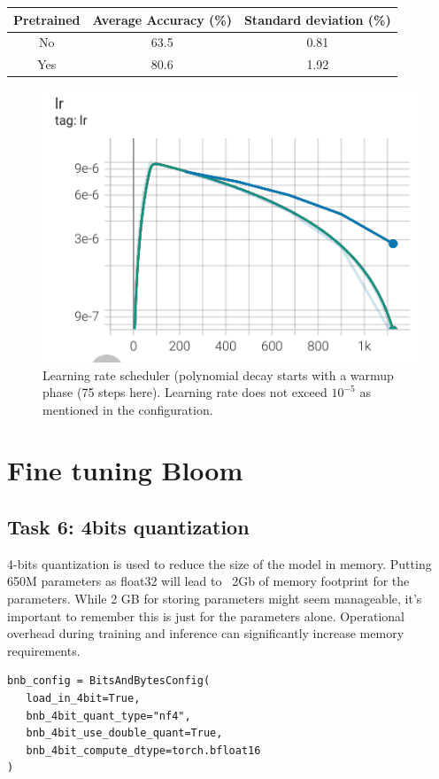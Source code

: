 \documentclass[a4paper]{article}
\begin{document}
\begin{center}
    \begin{tabular}{||c c c |} 
     \hline
     Pretrained & Average Accuracy (\%)  & Standard deviation  (\%)\\ [0.5ex] 
     \hline\hline
     No & 63.5  & 0.81\\ 
     \hline
     Yes & 80.6  & 1.92\\
     \hline
    \end{tabular}
\end{center}


\begin{figure}[ht]
    \centering
    \includegraphics[width=.6\textwidth]{figures/lr_curves.png}
    \caption{Learning rate scheduler (polynomial decay starts with a warmup phase (75 steps here). Learning rate does not exceed $10^{-5}$ as mentioned in the configuration.}
    \label{fig:lr}
\end{figure}

\section{Fine tuning Bloom}
\subsection*{Task 6: 4bits quantization}
4-bits quantization is used to reduce the size of the model in memory.
Putting 650M parameters as float32 will lead to ~2Gb of memory footprint for the parameters.
While 2 GB for storing parameters might seem manageable, it's important to remember this is just for the parameters alone.
Operational overhead during training and inference can significantly increase memory requirements.

\begin{verbatim}
bnb_config = BitsAndBytesConfig(
   load_in_4bit=True,
   bnb_4bit_quant_type="nf4",
   bnb_4bit_use_double_quant=True,
   bnb_4bit_compute_dtype=torch.bfloat16
)
\end{verbatim}
\end{document}
